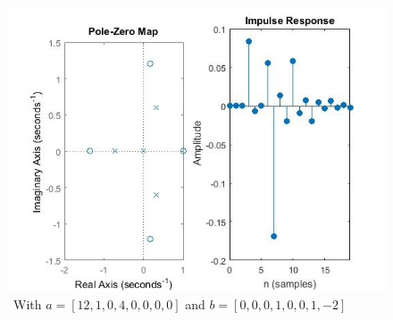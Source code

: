 \documentclass{article}
\begin{document}
\begin{figure}[H]
\includegraphics[scale = .5]{report5_3}
\ With $a = [12,1,0,4,0,0,0,0]$ and $b =[0,0,0,1,0,0,1,-2]$
\end{figure}



\break
\end{document}
